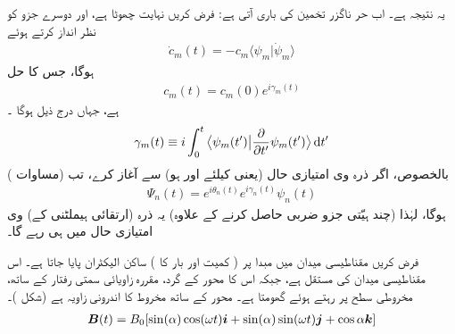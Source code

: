 یہ     نتیجہ ہے۔ اب حر ناگزر تخمین کی باری آتی ہے: فرض کریں  نہایت چھوٹا ہے، اور  دوسرے  جزو  کو نظر انداز کرتے ہوئے 
\begin{align}
\dot{c}_m (t) = - c_m \langle \psi_m | \dot{\psi}_m \rangle
\end{align} 
ہوگا، جس کا حل 
\begin{align}
c_m (t) = c_m (0) e^{i \gamma_m (t)}
\end{align}
ہے، جہاں درج ذیل ہوگا ۔
\begin{align}
\gamma_m (t) \equiv  i \int_0^t \big\langle \psi_m (t') \big| \frac{\partial}{\partial t'} \psi_m (t') \big \rangle \dif t'
\end{align}
بالخصوص، اگر ذرہ  وی امتیازی حال  (یعنی  کیلئے  اور  ہو)  سے آغاز کرے،  تب  (مساوات ) 
\begin{align}\label{مساوات_حر_وہیں_رہتا_ہے}
\Psi_n (t) = e^{i \theta_n (t)} e^{i \gamma_n (t)} \psi_n (t)
\end{align}
ہوگا، لہٰذا  (چند  ہیّتی جزو ضربی  حاصل کرنے کے علاوہ)  یہ ذرہ   (ارتقائی  ہیملٹنی کے)   وی امتیازی حال میں ہی رہے گا۔

فرض کریں  مقناطیسی میدان میں مبدا  پر ( کمیت  اور بار  کا )  ساکن  الیکٹران  پایا جاتا ہے۔ اس مقناطیسی میدان کی      مستقل ہے،  جبکہ اس کا     محور کے گرد،    مقررہ زاویائی  سمتی رفتار  کے ساتھ،   مخروطی سطح پر رہتے ہوئے گھومتا ہے۔ محور  کے ساتھ  مخروط کا اندرونی
 زاویہ  ہے  (شکل )۔
\begin{align}\label{مساوات_حر_مخروط_مقناطیسی_میدان}
{\ensuremath{{\boldsymbol{B}}}} (t) = B_0 [\sin(\alpha) \cos(\omega t) {\boldsymbol{i}} + \sin(\alpha) \sin(\omega t) {\boldsymbol{j}} + \cos \alpha {\boldsymbol{k}}]
\end{align}

